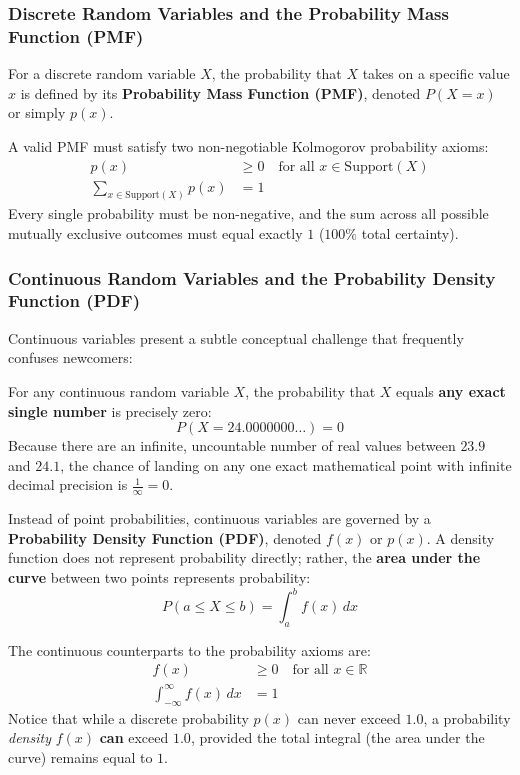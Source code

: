 \subsubsection{Discrete Random Variables and the Probability Mass Function (PMF)}
For a discrete random variable $X$, the probability that $X$ takes on a specific value $x$ is defined by its \textbf{Probability Mass Function (PMF)}, denoted $P(X = x)$ or simply $p(x)$. 

A valid PMF must satisfy two non-negotiable Kolmogorov probability axioms:
\begin{align}
p(x) &\ge 0 \quad \text{for all } x \in \text{Support}(X) \label{eq:pmf_non_neg}\\
\sum_{x \in \text{Support}(X)} p(x) &= 1 \label{eq:pmf_sum_one}
\end{align}
Every single probability must be non-negative, and the sum across all possible mutually exclusive outcomes must equal exactly $1$ ($100\%$ total certainty).

\subsubsection{Continuous Random Variables and the Probability Density Function (PDF)}
Continuous variables present a subtle conceptual challenge that frequently confuses newcomers:
\begin{warning}[The Continuous Probability Paradox: $P(X = x) = 0$]
For any continuous random variable $X$, the probability that $X$ equals \textbf{any exact single number} is precisely zero:
\begin{equation}
P(X = 24.0000000\dots) = 0
\end{equation}
Because there are an infinite, uncountable number of real values between $23.9$ and $24.1$, the chance of landing on any one exact mathematical point with infinite decimal precision is $\frac{1}{\infty} = 0$.
\end{warning}

Instead of point probabilities, continuous variables are governed by a \textbf{Probability Density Function (PDF)}, denoted $f(x)$ or $p(x)$. A density function does not represent probability directly; rather, the \textbf{area under the curve} between two points represents probability:
\begin{equation}
P(a \le X \le b) = \int_{a}^{b} f(x)\,dx\label{eq:pdf_integral}
\end{equation}

The continuous counterparts to the probability axioms are:
\begin{align}
f(x) &\ge 0 \quad \text{for all } x \in \mathbb{R} \label{eq:pdf_non_neg}\\
\int_{-\infty}^{\infty} f(x)\,dx &= 1 \label{eq:pdf_total_area}
\end{align}
Notice that while a discrete probability $p(x)$ can never exceed $1.0$, a probability \textit{density} $f(x)$ \textbf{can} exceed $1.0$, provided the total integral (the area under the curve) remains equal to $1$.

